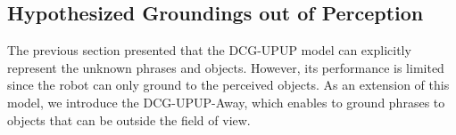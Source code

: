 %

\subsection{Hypothesized Groundings out of Perception}
The previous section presented that the DCG-UPUP model can explicitly represent the unknown phrases and objects. However, its performance is limited since the robot can only ground to the perceived objects. As an extension of this model, we introduce the DCG-UPUP-Away, which enables to ground phrases to objects that can be outside the field of view.

